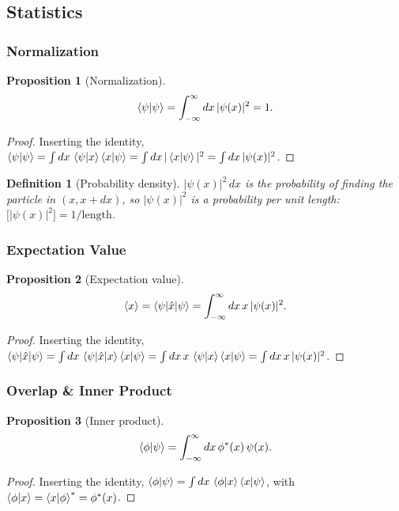 \documentclass{article}
\newtheorem{definition}{Definition}
\newtheorem{proposition}{Proposition}
\begin{document}
\subsection{Statistics}
\subsubsection{Normalization}
\begin{proposition}[Normalization]
    \begin{equation}
        \braket{\psi|\psi} = \int_{-\infty}^{\infty} dx\,|\psi(x)|^2 = 1.
    \end{equation}
\end{proposition}
\begin{proof}
    Inserting the identity, $\braket{\psi|\psi} = \int dx\,\braket{\psi|x}\braket{x|\psi} = \int dx\,|\braket{x|\psi}|^2 = \int dx\,|\psi(x)|^2$.
\end{proof}
\begin{definition}[Probability density]
    $|\psi(x)|^2\,dx$ is the probability of finding the particle in $(x, x + dx)$, so $|\psi(x)|^2$ is a probability per unit length: $\big[|\psi(x)|^2\big] = 1/\text{length}$.
\end{definition}

\subsubsection{Expectation Value}
\begin{proposition}[Expectation value]
    \begin{equation}
        \braket{x} = \braket{\psi|\hat{x}|\psi} = \int_{-\infty}^{\infty} dx\, x\,|\psi(x)|^2.
    \end{equation}
\end{proposition}
\begin{proof}
    Inserting the identity, $\braket{\psi|\hat{x}|\psi} = \int dx\,\braket{\psi|\hat{x}|x}\braket{x|\psi} = \int dx\, x\,\braket{\psi|x}\braket{x|\psi} = \int dx\, x\,|\psi(x)|^2$.
\end{proof}

\subsubsection{Overlap \& Inner Product}
\begin{proposition}[Inner product]
    \begin{equation}
        \braket{\phi|\psi} = \int_{-\infty}^{\infty} dx\,\phi^*(x)\,\psi(x).
    \end{equation}
\end{proposition}
\begin{proof}
    Inserting the identity, $\braket{\phi|\psi} = \int dx\,\braket{\phi|x}\braket{x|\psi}$, with $\braket{\phi|x} = \braket{x|\phi}^* = \phi^*(x)$.
\end{proof}
\end{document}
